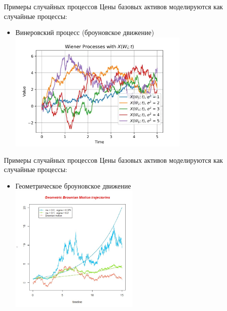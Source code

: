 \documentclass{beamer}
\begin{document}
    \begin{frame}{Примеры случайных процессов}
        Цены базовых активов моделируются как случайные процессы:
        \begin{itemize}
            \item Винеровский процесс (броуновское движение)
            \includegraphics[width=0.7\textwidth]{wiener.png}
        \end{itemize}
    \end{frame}

    \begin{frame}{Примеры случайных процессов}
        Цены базовых активов моделируются как случайные процессы:
        \begin{itemize}
            \item Геометрическое броуновское движение\\
            \includegraphics[width=0.5\textwidth]{geometric_brownian_trajectories.jpg}
        \end{itemize}
    \end{frame}
\end{document}
